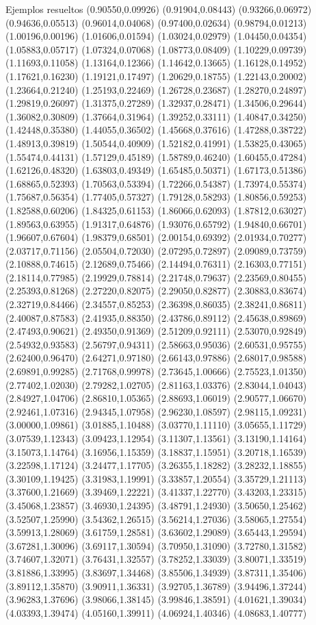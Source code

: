\documentclass[11pt,a4paper]{article}
\begin{document}
\begin{fmex}{Ejemplos resueltos}
(0.90550,0.09926) (0.91904,0.08443) (0.93266,0.06972) (0.94636,0.05513) (0.96014,0.04068) (0.97400,0.02634) (0.98794,0.01213) (1.00196,0.00196) (1.01606,0.01594) (1.03024,0.02979) (1.04450,0.04354) (1.05883,0.05717) (1.07324,0.07068) (1.08773,0.08409) (1.10229,0.09739) (1.11693,0.11058) (1.13164,0.12366) (1.14642,0.13665) (1.16128,0.14952) (1.17621,0.16230) (1.19121,0.17497) (1.20629,0.18755) (1.22143,0.20002) (1.23664,0.21240) (1.25193,0.22469) (1.26728,0.23687) (1.28270,0.24897) (1.29819,0.26097) (1.31375,0.27289) (1.32937,0.28471) (1.34506,0.29644) (1.36082,0.30809) (1.37664,0.31964) (1.39252,0.33111) (1.40847,0.34250) (1.42448,0.35380) (1.44055,0.36502) (1.45668,0.37616) (1.47288,0.38722) (1.48913,0.39819) (1.50544,0.40909) (1.52182,0.41991) (1.53825,0.43065) (1.55474,0.44131) (1.57129,0.45189) (1.58789,0.46240) (1.60455,0.47284) (1.62126,0.48320) (1.63803,0.49349) (1.65485,0.50371) (1.67173,0.51386) (1.68865,0.52393) (1.70563,0.53394) (1.72266,0.54387) (1.73974,0.55374) (1.75687,0.56354) (1.77405,0.57327) (1.79128,0.58293) (1.80856,0.59253) (1.82588,0.60206) (1.84325,0.61153) (1.86066,0.62093) (1.87812,0.63027) (1.89563,0.63955) (1.91317,0.64876) (1.93076,0.65792) (1.94840,0.66701) (1.96607,0.67604) (1.98379,0.68501) (2.00154,0.69392) (2.01934,0.70277) (2.03717,0.71156) (2.05504,0.72030) (2.07295,0.72897) (2.09089,0.73759) (2.10888,0.74615) (2.12689,0.75466) (2.14494,0.76311) (2.16303,0.77151) (2.18114,0.77985) (2.19929,0.78814) (2.21748,0.79637) (2.23569,0.80455) (2.25393,0.81268) (2.27220,0.82075) (2.29050,0.82877) (2.30883,0.83674) (2.32719,0.84466) (2.34557,0.85253) (2.36398,0.86035) (2.38241,0.86811) (2.40087,0.87583) (2.41935,0.88350) (2.43786,0.89112) (2.45638,0.89869) (2.47493,0.90621) (2.49350,0.91369) (2.51209,0.92111) (2.53070,0.92849) (2.54932,0.93583) (2.56797,0.94311) (2.58663,0.95036) (2.60531,0.95755) (2.62400,0.96470) (2.64271,0.97180) (2.66143,0.97886) (2.68017,0.98588) (2.69891,0.99285) (2.71768,0.99978) (2.73645,1.00666) (2.75523,1.01350) (2.77402,1.02030) (2.79282,1.02705) (2.81163,1.03376) (2.83044,1.04043) (2.84927,1.04706) (2.86810,1.05365) (2.88693,1.06019) (2.90577,1.06670) (2.92461,1.07316) (2.94345,1.07958) (2.96230,1.08597) (2.98115,1.09231) (3.00000,1.09861) (3.01885,1.10488) (3.03770,1.11110) (3.05655,1.11729) (3.07539,1.12343) (3.09423,1.12954) (3.11307,1.13561) (3.13190,1.14164) (3.15073,1.14764) (3.16956,1.15359) (3.18837,1.15951) (3.20718,1.16539) (3.22598,1.17124) (3.24477,1.17705) (3.26355,1.18282) (3.28232,1.18855) (3.30109,1.19425) (3.31983,1.19991) (3.33857,1.20554) (3.35729,1.21113) (3.37600,1.21669) (3.39469,1.22221) (3.41337,1.22770) (3.43203,1.23315) (3.45068,1.23857) (3.46930,1.24395) (3.48791,1.24930) (3.50650,1.25462) (3.52507,1.25990) (3.54362,1.26515) (3.56214,1.27036) (3.58065,1.27554) (3.59913,1.28069) (3.61759,1.28581) (3.63602,1.29089) (3.65443,1.29594) (3.67281,1.30096) (3.69117,1.30594) (3.70950,1.31090) (3.72780,1.31582) (3.74607,1.32071) (3.76431,1.32557) (3.78252,1.33039) (3.80071,1.33519) (3.81886,1.33995) (3.83697,1.34468) (3.85506,1.34939) (3.87311,1.35406) (3.89112,1.35870) (3.90911,1.36331) (3.92705,1.36789) (3.94496,1.37244) (3.96283,1.37696) (3.98066,1.38145) (3.99846,1.38591) (4.01621,1.39034) (4.03393,1.39474) (4.05160,1.39911) (4.06924,1.40346) (4.08683,1.40777) 
\end{fmex}
\end{document}
